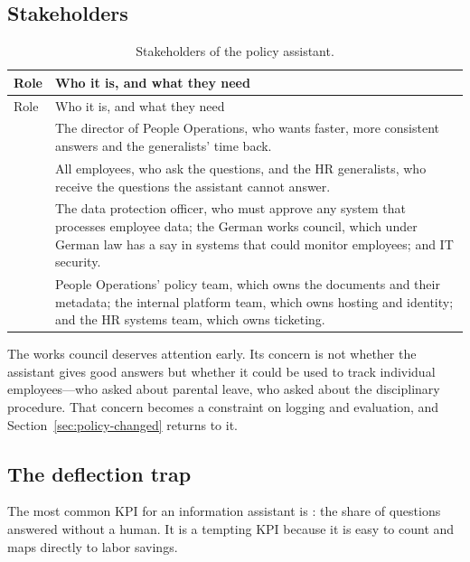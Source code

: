\subsection{Stakeholders}

\begingroup
\small
\begin{xltabular}{\textwidth}{@{}>{\raggedright\arraybackslash}p{2.0cm}>{\raggedright\arraybackslash}X@{}}
\caption{Stakeholders of the policy assistant.}\label{tab:policy-stakeholders}\\
\toprule
{} Role & Who it is, and what they need \\
\midrule
\endfirsthead
\toprule
{} Role & Who it is, and what they need \\
\midrule
\endhead
{} & The director of People Operations, who wants faster, more consistent answers and the generalists' time back. \\
 & All employees, who ask the questions, and the HR generalists, who receive the questions the assistant cannot answer. \\
 & The data protection officer, who must approve any system that processes employee data; the German works council, which under German law has a say in systems that could monitor employees; and IT security. \\
 & People Operations' policy team, which owns the documents and their metadata; the internal platform team, which owns hosting and identity; and the HR systems team, which owns ticketing. \\
\bottomrule
\end{xltabular}
\endgroup

The works council deserves attention early. Its concern is not whether the assistant gives good answers but whether it could be used to track individual employees---who asked about parental leave, who asked about the disciplinary procedure. That concern becomes a constraint on logging and evaluation, and Section~\ref{sec:policy-changed} returns to it.

\subsection{The deflection trap}

The most common KPI for an information assistant is : the share of questions answered without a human. It is a tempting KPI because it is easy to count and maps directly to labor savings.

